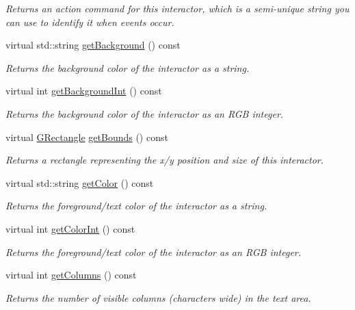 \begin{DoxyCompactItemize}
\begin{DoxyCompactList}\small\item\em Returns an action command for this interactor, which is a semi-\/unique string you can use to identify it when events occur. \end{DoxyCompactList}\item 
virtual std\+::string \mbox{\hyperlink{classsgl_1_1GInteractor_a808e22cc1fdfbecf71ed8c64ef4600e0}{get\+Background}} () const
\begin{DoxyCompactList}\small\item\em Returns the background color of the interactor as a string. \end{DoxyCompactList}\item 
virtual int \mbox{\hyperlink{classsgl_1_1GInteractor_a9e827257a55cb8cf4d9de2ec6bcfd7a0}{get\+Background\+Int}} () const
\begin{DoxyCompactList}\small\item\em Returns the background color of the interactor as an R\+GB integer. \end{DoxyCompactList}\item 
virtual \mbox{\hyperlink{structsgl_1_1GRectangle}{G\+Rectangle}} \mbox{\hyperlink{classsgl_1_1GInteractor_a29e6ac35a0b48f491a4c88194cc5da3b}{get\+Bounds}} () const
\begin{DoxyCompactList}\small\item\em Returns a rectangle representing the x/y position and size of this interactor. \end{DoxyCompactList}\item 
virtual std\+::string \mbox{\hyperlink{classsgl_1_1GInteractor_aa061dfa488c31e18549d64363c1d0e34}{get\+Color}} () const
\begin{DoxyCompactList}\small\item\em Returns the foreground/text color of the interactor as a string. \end{DoxyCompactList}\item 
virtual int \mbox{\hyperlink{classsgl_1_1GInteractor_a9635c7af766cdc3417f346683fa0e6c1}{get\+Color\+Int}} () const
\begin{DoxyCompactList}\small\item\em Returns the foreground/text color of the interactor as an R\+GB integer. \end{DoxyCompactList}\item 
virtual int \mbox{\hyperlink{classsgl_1_1GTextArea_a6b5395e749ae5c217093d74f68f1ca3a}{get\+Columns}} () const
\begin{DoxyCompactList}\small\item\em Returns the number of visible columns (characters wide) in the text area. \end{DoxyCompactList}\item 

\end{DoxyCompactItemize}
